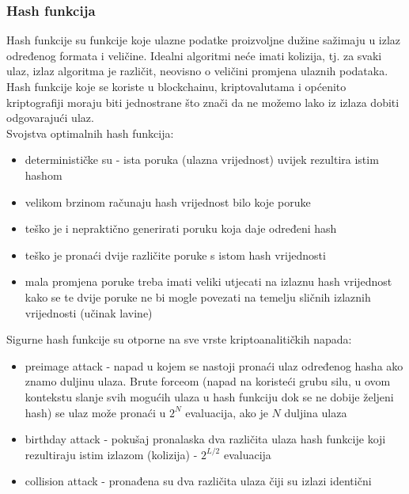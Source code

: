 \documentclass[12pt]{article}
\begin{document}
\subsubsection{Hash funkcija}
Hash funkcije su funkcije koje ulazne podatke proizvoljne dužine sažimaju u izlaz određenog formata i veličine. Idealni algoritmi neće imati kolizija, tj. za svaki ulaz, izlaz algoritma je različit, neovisno o veličini promjena ulaznih podataka.\\
Hash funkcije koje se koriste u blockchainu, kriptovalutama i općenito kriptografiji moraju biti jednostrane što znači da ne možemo lako iz izlaza dobiti odgovarajući ulaz.\\
Svojstva optimalnih hash funkcija:
\begin{itemize}
	\item determinističke su - ista poruka (ulazna vrijednost) uvijek rezultira istim hashom
	\item velikom brzinom računaju hash vrijednost bilo koje poruke
	\item teško je i nepraktično generirati poruku koja daje određeni hash
	\item teško je pronaći dvije različite poruke s istom hash vrijednosti
	\item mala promjena poruke treba imati veliki utjecati na izlaznu hash vrijednost kako se te dvije poruke ne bi mogle povezati na temelju sličnih izlaznih vrijednosti (učinak lavine)\cite{ideal-hash-fun}
\end{itemize}
%
Sigurne hash funkcije su otporne na sve vrste kriptoanalitičkih napada:
\begin{itemize}
	\item preimage attack - napad u kojem se nastoji pronaći ulaz određenog hasha ako znamo duljinu ulaza. Brute forceom (napad na koristeći grubu silu, u ovom kontekstu slanje svih mogućih ulaza u hash funkciju dok se ne dobije željeni hash) se ulaz može pronaći u $2^N$ evaluacija, ako je $N$ duljina ulaza
	\item birthday attack - pokušaj pronalaska dva različita ulaza hash funkcije koji rezultiraju istim izlazom (kolizija) - $2^{L/2}$ evaluacija
	\item collision attack - pronađena su dva različita ulaza čiji su izlazi identični
\end{itemize}
\end{document}
